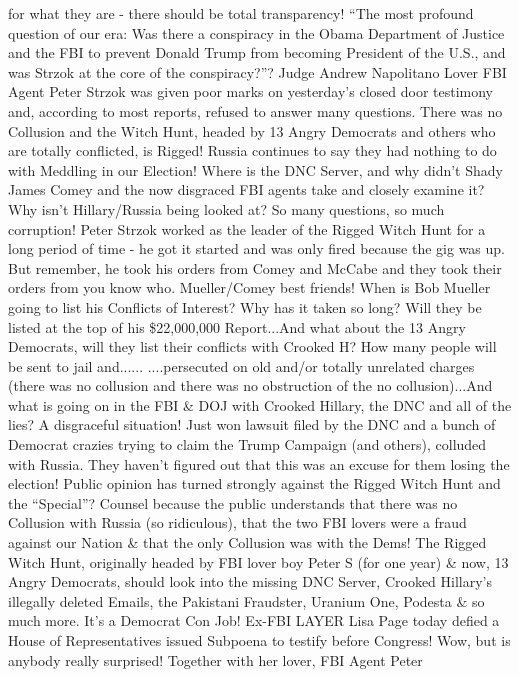 for what they are - there should be total transparency! ``The most
profound question of our era: Was there a conspiracy in the Obama
Department of Justice and the FBI to prevent Donald Trump from becoming
President of the U.S., and was Strzok at the core of the conspiracy?''?
Judge Andrew Napolitano Lover FBI Agent Peter Strzok was given poor
marks on yesterday's closed door testimony and, according to most
reports, refused to answer many questions. There was no Collusion and
the Witch Hunt, headed by 13 Angry Democrats and others who are totally
conflicted, is Rigged! Russia continues to say they had nothing to do
with Meddling in our Election! Where is the DNC Server, and why didn't
Shady James Comey and the now disgraced FBI agents take and closely
examine it? Why isn't Hillary/Russia being looked at? So many questions,
so much corruption! Peter Strzok worked as the leader of the Rigged
Witch Hunt for a long period of time - he got it started and was only
fired because the gig was up. But remember, he took his orders from
Comey and McCabe and they took their orders from you know who.
Mueller/Comey best friends! When is Bob Mueller going to list his
Conflicts of Interest? Why has it taken so long? Will they be listed at
the top of his \$22,000,000 Report...And what about the 13 Angry
Democrats, will they list their conflicts with Crooked H? How many
people will be sent to jail and...... ....persecuted on old and/or
totally unrelated charges (there was no collusion and there was no
obstruction of the no collusion)...And what is going on in the FBI \&
DOJ with Crooked Hillary, the DNC and all of the lies? A disgraceful
situation! Just won lawsuit filed by the DNC and a bunch of Democrat
crazies trying to claim the Trump Campaign (and others), colluded with
Russia. They haven't figured out that this was an excuse for them losing
the election! Public opinion has turned strongly against the Rigged
Witch Hunt and the ``Special''? Counsel because the public understands
that there was no Collusion with Russia (so ridiculous), that the two
FBI lovers were a fraud against our Nation \& that the only Collusion
was with the Dems! The Rigged Witch Hunt, originally headed by FBI lover
boy Peter S (for one year) \& now, 13 Angry Democrats, should look into
the missing DNC Server, Crooked Hillary's illegally deleted Emails, the
Pakistani Fraudster, Uranium One, Podesta \& so much more. It's a
Democrat Con Job! Ex-FBI LAYER Lisa Page today defied a House of
Representatives issued Subpoena to testify before Congress! Wow, but is
anybody really surprised! Together with her lover, FBI Agent Peter
